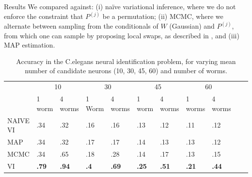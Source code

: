 \documentclass[final]{beamer}
\begin{document}
\begin{frame}[allowframebreaks]
\begin{minipage}[htp][1\textheight][t]{\textwidth}
\begin{columns}[t]
\begin{column}{.5\linewidth}
      	\begin{block}{Results}
	\large
We compared against: (i) na\"ive variational inference,
where we do not enforce the constraint that $P^{(j)}$ be a permutation; (ii) MCMC, where we alternate between sampling from the
conditionals of $W$ (Gaussian) and ${P^{(j)}}$, from which one can
sample by proposing local swaps, as described in \cite{Diaconis2009},
and (iii) MAP estimation. 


\begin{table}[t]
     \caption{Accuracy in the C.elegans neural identification problem, for varying mean number of candidate neurons (10, 30, 45, 60) and number of worms.}
   \label{table:celeganssup}

   \centering
  \begin{tabular}{lllllllllll}
    & \multicolumn{2}{c}{10} & \multicolumn{2}{c}{30} &   \multicolumn{2}{c}{45} & \multicolumn{2}{c}{60} \\
    \cmidrule(lr){2-3} \cmidrule(lr){4-5} \cmidrule(lr){6-7} \cmidrule(lr){8-9}
& 1 worm & 4 worms & 1 Worm & 4 worms & 1 worm & 4 worms & 1 worms & 4 worms \\
    \midrule 
    NAIVE VI &.34 & .32 & .16 & .16 & .13 & .12 & .11 & .12 \\
   MAP   & .34 & .32  &.17 &.17& .14 & .13 & .13 & .12 \\
    MCMC   & .34 & .65  &.18 &.28& .14 & .17 & .13 & .15 \\
  
    VI   & \textbf{.79} & \textbf{.94} & \textbf{.4} & \textbf{.69} & \textbf{.25}&  \textbf{.51} & \textbf{.21} & \textbf{.44}\\
 
    \bottomrule
  \end{tabular}
\end{table}



\end{block}
\end{column}
\end{columns}
\end{minipage}
\end{frame}
\end{document}
